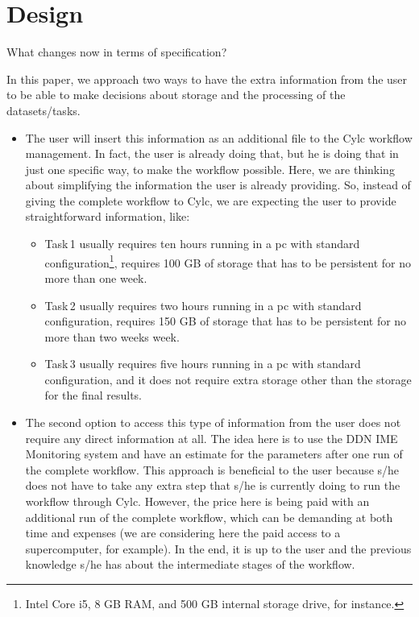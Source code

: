 \documentclass[a4paper]{article}
\begin{document}
\section{Design}
What changes now in terms of specification?


In this paper, we approach two ways to have the extra information from the user to be able to make decisions about storage and the processing of the datasets/tasks.

\begin{itemize}

\item The user will insert this information as an additional file to the Cylc workflow management. In fact, the user is already doing that, but he is doing that in just one specific way, to make the workflow possible. Here, we are thinking about simplifying the information the user is already providing. So, instead of giving the complete workflow to Cylc, we are expecting the user to provide straightforward information, like:

\begin{itemize}

\item Task\,1 usually requires ten hours running in a pc with standard configuration\footnote{Intel Core i5, 8 GB RAM, and 500 GB internal storage drive, for instance.}, requires 100 GB of storage that has to be persistent for no more than one week.

\item Task\,2 usually requires two hours running in a pc with standard configuration, requires 150 GB of storage that has to be persistent for no more than two weeks week.

\item Task\,3 usually requires five hours running in a pc with standard configuration, and it does not require extra storage other than the storage for the final results.

\end{itemize}

\item The second option to access this type of information from the user does not require any direct information at all. The idea here is to use the DDN IME Monitoring system and have an estimate for the parameters after one run of the complete workflow. This approach is beneficial to the user because s/he does not have to take any extra step that s/he is currently doing to run the workflow through Cylc. However, the price here is being paid with an additional run of the complete workflow, which can be demanding at both time and expenses (we are considering here the paid access to a supercomputer, for example). In the end, it is up to the user and the previous knowledge s/he has about the intermediate stages of the workflow.

\end{itemize}
\end{document}
